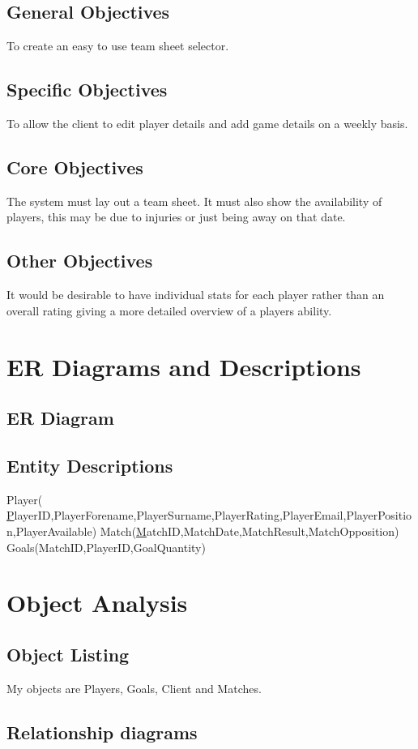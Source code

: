 \subsection{General Objectives}
To create an easy to use team sheet selector.
\subsection{Specific Objectives}
To allow the client to edit player details and add game details on a weekly basis.
\subsection{Core Objectives}
The system must lay out a team sheet. It must also show the availability of players, this may be due to injuries or just being away on that date.     
\subsection{Other Objectives}
It would be desirable to have individual stats for each player rather than an overall rating giving a more detailed overview of a players ability.
\section{ER Diagrams and Descriptions}

\subsection{ER Diagram}


\subsection{Entity Descriptions}
Player( {\ul PlayerID},PlayerForename,PlayerSurname,PlayerRating,PlayerEmail,PlayerPosition,PlayerAvailable)
Match({\ul MatchID},MatchDate,MatchResult,MatchOpposition)
Goals(MatchID,PlayerID,GoalQuantity)
\section{Object Analysis}

\subsection{Object Listing}
 My objects are Players, Goals, Client and Matches. 
\subsection{Relationship diagrams}

